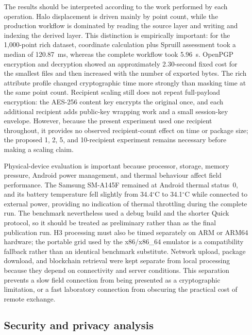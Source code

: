\documentclass[a4paper,UKenglish,cleveref,autoref,thm-restate]{lipics-v2021}
\begin{document}
The results should be interpreted according to the work performed by each operation. Halo displacement is driven mainly by point count, while the production workflow is dominated by reading the source layer and writing and indexing the derived layer. This distinction is empirically important: for the 1,000-point rich dataset, coordinate calculation plus Spruill assessment took a median of 120.87~ms, whereas the complete workflow took 5.96~s. OpenPGP encryption and decryption showed an approximately 2.30-second fixed cost for the smallest files and then increased with the number of exported bytes. The rich attribute profile changed cryptographic time more strongly than masking time at the same point count. Recipient scaling still does not repeat full-payload encryption: the AES-256 content key encrypts the original once, and each additional recipient adds public-key wrapping work and a small session-key envelope. However, because the present experiment used one recipient throughout, it provides no observed recipient-count effect on time or package size; the proposed 1, 2, 5, and 10-recipient experiment remains necessary before making a scaling claim.

Physical-device evaluation is important because processor, storage, memory pressure, Android power management, and thermal behaviour affect field performance. The Samsung SM-A145F remained at Android thermal status~0, and its battery temperature fell slightly from 34.4$^{\circ}$C to 34.1$^{\circ}$C while connected to external power, providing no indication of thermal throttling during the complete run. The benchmark nevertheless used a debug build and the shorter Quick protocol, so it should be treated as preliminary rather than as the final publication run. H3 processing must also be timed separately on ARM or ARM64 hardware; the portable grid used by the x86/x86\_64 emulator is a compatibility fallback rather than an identical benchmark substitute. Network upload, package download, and blockchain retrieval were kept separate from local processing because they depend on connectivity and server conditions. This separation prevents a slow field connection from being presented as a cryptographic limitation, or a fast laboratory connection from obscuring the practical cost of remote exchange.

\subsection{Security and privacy analysis}
\end{document}
